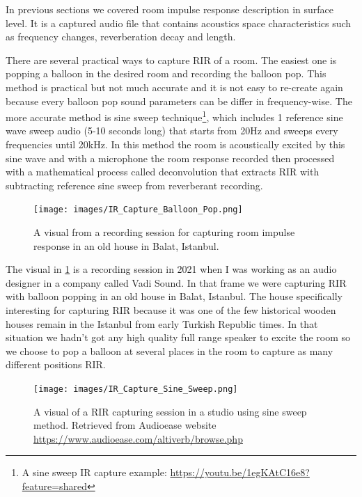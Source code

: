             In previous sections we covered room impulse response description in surface level. It is a captured audio file that contains acoustics space characteristics such as frequency changes, reverberation decay and length.\par

            There are several practical ways to capture RIR of a room. The easiest one is popping a balloon in the desired room and recording the balloon pop. This method is practical but not much accurate and it is not easy to re-create again because every balloon pop sound parameters can be differ in frequency-wise\cite{RIR_Swept-Sine_Technique}. The more accurate method is sine sweep technique\footnote{A sine sweep IR capture example: \url{https://youtu.be/1egKAtC16e8?feature=shared}}, which includes 1 reference sine wave sweep audio (5-10 seconds long) that starts from 20Hz and sweeps every frequencies until 20kHz\cite{Auditory_Perception_of_Sound_Sources}. In this method the room is acoustically excited by this sine wave and with a microphone the room response recorded then processed with a mathematical process called deconvolution that extracts RIR with subtracting reference sine sweep from reverberant recording.\par

            \begin{figure}[H]
                \centering
                \texttt{[image: images/IR\_Capture\_Balloon\_Pop.png]}
                \caption{A visual from a recording session for capturing room impulse response in an old house in Balat, Istanbul.}
                \label{fig:IR_BALLOON}
            \end{figure}            

            The visual in \ref{fig:IR_BALLOON} is a recording session in 2021 when I was working as an audio designer in a company called Vadi Sound. In that frame we were capturing RIR with balloon popping in an old house in Balat, Istanbul. The house specifically interesting for capturing RIR because it was one of the few historical wooden houses remain in the Istanbul from early Turkish Republic times. In that situation we hadn't got any high quality full range speaker to excite the room so we choose to pop a balloon at several places in the room to capture as many different positions RIR.\par

            \begin{figure}[H]
                \centering
                \texttt{[image: images/IR\_Capture\_Sine\_Sweep.png]}
                \caption{A visual of a RIR capturing session in a studio using sine sweep method. Retrieved from Audioease website \url{https://www.audioease.com/altiverb/browse.php}}
                \label{fig:IR_SINE}
            \end{figure}

